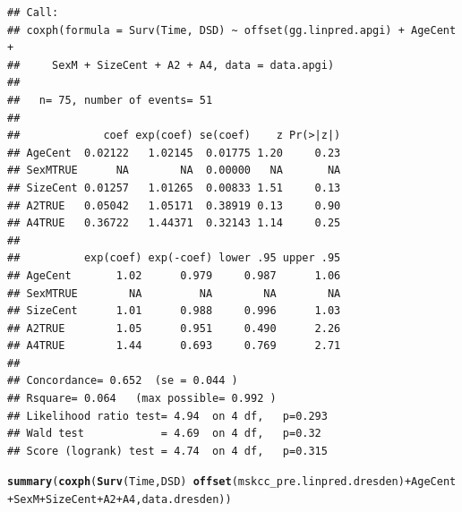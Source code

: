 \documentclass{article}\usepackage[]{graphicx}\usepackage[]{color}
\makeatletter
\newcommand{\hlopt}[1]{\textcolor[rgb]{0,0,0}{#1}}%
\newcommand{\hlstd}[1]{\textcolor[rgb]{0.345,0.345,0.345}{#1}}%
\newcommand{\hlkwd}[1]{\textcolor[rgb]{0.737,0.353,0.396}{\textbf{#1}}}%
\newenvironment{kframe}{%
 \def\at@end@of@kframe{}%
 \ifinner\ifhmode%
  \def\at@end@of@kframe{\end{minipage}}%
  \begin{minipage}{\columnwidth}%
 \fi\fi%
 \def\FrameCommand##1{\hskip\@totalleftmargin \hskip-\fboxsep
 \colorbox{shadecolor}{##1}\hskip-\fboxsep
     \hskip-\linewidth \hskip-\@totalleftmargin \hskip\columnwidth}%
 \MakeFramed {\advance\hsize-\width
   \@totalleftmargin\z@ \linewidth\hsize
   \@setminipage}}%
 {\par\unskip\endMakeFramed%
 \at@end@of@kframe}
\newenvironment{knitrout}{}{} %
\makeatother
\begin{document}
\begin{knitrout}
\begin{kframe}
{\ttfamily\noindent{}}\begin{verbatim}
## Call:
## coxph(formula = Surv(Time, DSD) ~ offset(gg.linpred.apgi) + AgeCent + 
##     SexM + SizeCent + A2 + A4, data = data.apgi)
## 
##   n= 75, number of events= 51 
## 
##             coef exp(coef) se(coef)    z Pr(>|z|)
## AgeCent  0.02122   1.02145  0.01775 1.20     0.23
## SexMTRUE      NA        NA  0.00000   NA       NA
## SizeCent 0.01257   1.01265  0.00833 1.51     0.13
## A2TRUE   0.05042   1.05171  0.38919 0.13     0.90
## A4TRUE   0.36722   1.44371  0.32143 1.14     0.25
## 
##          exp(coef) exp(-coef) lower .95 upper .95
## AgeCent       1.02      0.979     0.987      1.06
## SexMTRUE        NA         NA        NA        NA
## SizeCent      1.01      0.988     0.996      1.03
## A2TRUE        1.05      0.951     0.490      2.26
## A4TRUE        1.44      0.693     0.769      2.71
## 
## Concordance= 0.652  (se = 0.044 )
## Rsquare= 0.064   (max possible= 0.992 )
## Likelihood ratio test= 4.94  on 4 df,   p=0.293
## Wald test            = 4.69  on 4 df,   p=0.32
## Score (logrank) test = 4.74  on 4 df,   p=0.315
\end{verbatim}
\begin{alltt}
\hlkwd{summary}\hlstd{(}\hlkwd{coxph}\hlstd{(}\hlkwd{Surv}\hlstd{(Time, DSD)} \hlopt{~} \hlkwd{offset}\hlstd{(mskcc_pre.linpred.dresden)} \hlopt{+} \hlstd{AgeCent} \hlopt{+} \hlstd{SexM} \hlopt{+} \hlstd{SizeCent} \hlopt{+} \hlstd{A2} \hlopt{+} \hlstd{A4, data.dresden))}
\end{alltt}



\end{kframe}
\end{knitrout}
\end{document}
